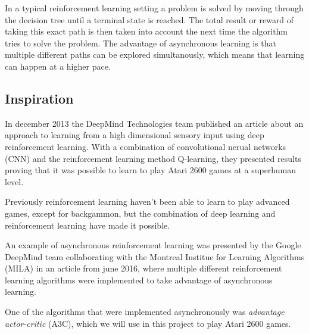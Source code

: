 \documentclass[11pt]{article}
\begin{document}
In a typical reinforcement learning setting a problem is solved
by moving through the decision tree until a terminal state is reached.
The total result or reward of taking this exact path is then
taken into account the next time the algorithm tries to solve the problem.
The advantage of asynchronous learning is that multiple different paths
can be explored simultanously, which means that learning can happen at
a higher pace.

\subsection{Inspiration}

In december 2013 the DeepMind Technologies team published an article
about an approach to learning from a high dimensional sensory input
using deep reinforcement learning\cite{dqn}.
With a combination of convolutional nerual networks (CNN) and
the reinforcement learning method Q-learning\cite{RLbook}, they
presented results proving that it was possible to learn to play Atari
2600 games at a superhuman level.

Previously reinforcement learning haven't been able to learn to play
advanced games, except for backgammon\cite{tdgammon},
but the combination of deep learning and reinforcement learning
have made it possible.



An example of asynchronous reinforcement learning was presented by the
Google DeepMind team collaborating with the Montreal Institue for Learning
Algorithms (MILA) in an article from june 2016, where multiple different
reinforcement learning algorithms were implemented to take advantage of
asynchronous learning\cite{a3c}.

One of the  algorithms that were implemented asynchronously
was \textit{advantage actor-critic} (A3C), which we will use in this
project to play Atari 2600 games.


%
%
\end{document}
